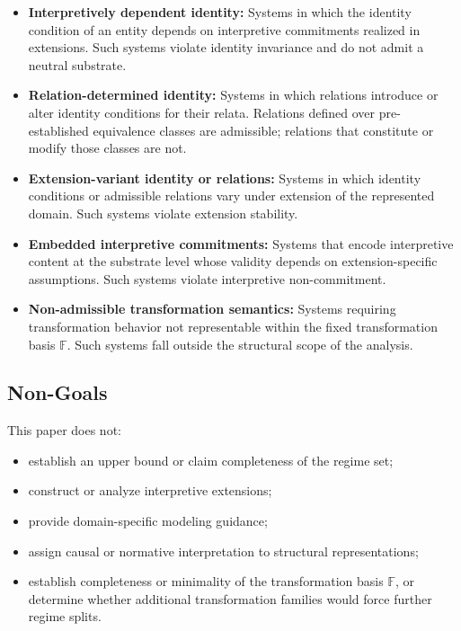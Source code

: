 \begin{itemize}

  \item \textbf{Interpretively dependent identity:}
        Systems in which the identity condition of an entity
        depends on interpretive commitments realized in extensions.
        Such systems violate identity invariance and
        do not admit a neutral substrate.

  \item \textbf{Relation-determined identity:}
      Systems in which relations introduce or alter identity conditions
      for their relata.
      Relations defined over pre-established
      equivalence classes are admissible;
      relations that constitute or modify those classes are not.

  \item \textbf{Extension-variant identity or relations:}
        Systems in which identity conditions or admissible relations
        vary under extension of the represented domain.
        Such systems violate extension stability.

  \item \textbf{Embedded interpretive commitments:}
        Systems that encode interpretive content at the substrate level
        whose validity depends on extension-specific assumptions.
        Such systems violate interpretive non-commitment.

  \item \textbf{Non-admissible transformation semantics:}
        Systems requiring transformation behavior not representable
        within the fixed transformation basis $\mathbb{F}$.
        Such systems fall outside the structural scope of the analysis.

\end{itemize}

\subsection{Non-Goals}
\label{subsec:limits_nongoals}

This paper does not:

\begin{itemize}
  \item establish an upper bound or claim completeness of the regime set;
  \item construct or analyze interpretive extensions;
  \item provide domain-specific modeling guidance;
  \item assign causal or normative interpretation to structural representations;
  \item establish completeness or minimality of the transformation basis
      $\mathbb{F}$, or determine whether additional transformation families
      would force further regime splits.
\end{itemize}

